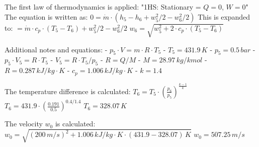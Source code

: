 The first law of thermodynamics is applied:  
"1HS: Stationary = \( Q = 0 \), \( W = 0 \)"  
The equation is written as:  
\( 0 = \dot{m} \cdot (h_5 - h_6 + w_5^2 / 2 - w_6^2 / 2) \)  
This is expanded to:  
\( = \dot{m} \cdot c_p \cdot (T_5 - T_6) + w_5^2 / 2 - w_6^2 / 2 \)  
\( w_6 = \sqrt{w_5^2 + 2 \cdot c_p \cdot (T_5 - T_6)} \)

Additional notes and equations:  
- \( p_5 \cdot V = m \cdot R \cdot T_5 \)  
- \( T_5 = 431.9 \, K \)  
- \( p_5 = 0.5 \, bar \)  
- \( p_5 \cdot V_5 = R \cdot T_5 \)  
- \( V_5 = R \cdot T_5 / p_5 \)  
- \( R = Q / M \)  
- \( M = 28.97 \, kg/kmol \)  
- \( R = 0.287 \, kJ/kg·K \)  
- \( c_p = 1.006 \, kJ/kg·K \)  
- \( k = 1.4 \)

The temperature difference is calculated:  
\( T_6 = T_5 \cdot \left( \frac{p_6}{p_5} \right)^{\frac{k-1}{k}} \)  
\( T_6 = 431.9 \cdot \left( \frac{0.191}{0.5} \right)^{0.4/1.4} \)  
\( T_6 = 328.07 \, K \)

The velocity \( w_0 \) is calculated:  
\( w_0 = \sqrt{(200 \, m/s)^2 + 1.006 \, kJ/kg·K \cdot (431.9 - 328.07) \, K} \)  
\( w_0 = 507.25 \, m/s \)